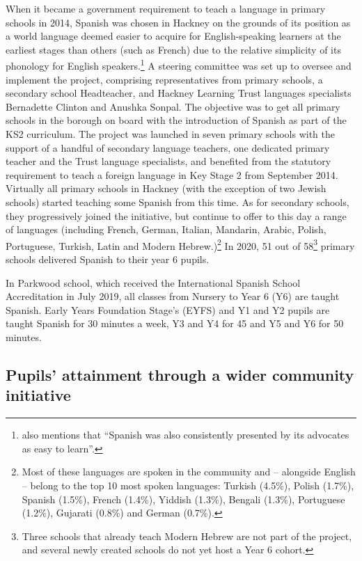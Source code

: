 \documentclass[output=paper]{langscibook}
\begin{document}
\begin{sloppypar}
When it became a government requirement to teach a language in primary schools in 2014, Spanish was chosen in Hackney on the grounds of its position as a world language deemed easier to acquire for English-speaking learners at the earliest stages than others (such as French)  due to the relative simplicity of its phonology for English speakers.\footnote{\citet[8]{McLelland2018} also mentions that “Spanish was also consistently presented by its advocates as easy to learn”.} A steering committee was set up to oversee and implement the project, comprising representatives from primary schools, a secondary school Headteacher, and Hackney Learning Trust languages specialists Bernadette Clinton and Anushka Sonpal. The objective was to get all primary schools in the borough on board with the introduction of Spanish as part of the KS2 curriculum. The project was launched in seven primary schools with the support of a handful of secondary language teachers, one dedicated primary teacher and the Trust language specialists, and benefited from the statutory requirement to teach a foreign language in Key Stage 2 from  {September 2014}. Virtually all primary schools in Hackney (with the exception of two Jewish schools) started teaching some Spanish from this time. As for secondary schools, they progressively joined the initiative, but continue to offer to this day a range of languages (including French, German, Italian, Mandarin, Arabic, Polish, Portuguese, Turkish, Latin and Modern Hebrew.)\footnote{Most of these languages are spoken in the community and -- alongside English -- belong to the top 10 most spoken languages: Turkish (4.5\%), Polish (1.7\%), Spanish (1.5\%), French (1.4\%), Yiddish (1.3\%), Bengali (1.3\%), Portuguese (1.2\%), Gujarati (0.8\%) and German (0.7\%).} In 2020, 51 out of 58\footnote{Three schools that already teach Modern Hebrew are not part of the project, and several newly created schools do not yet host a Year 6 cohort.} primary schools delivered Spanish to their year 6 pupils.\end{sloppypar}

In Parkwood school, which received the International Spanish School Accreditation in {July 2019}, all classes from Nursery to Year 6 (Y6) are taught Spanish. Early Years Foundation Stage’s (EYFS) and Y1 and Y2 pupils are taught Spanish for 30 minutes a week, Y3 and Y4 for 45 and Y5 and Y6 for 50 minutes.

\subsection{Pupils’ attainment through a wider community initiative}\largerpage[2]
\end{document}
